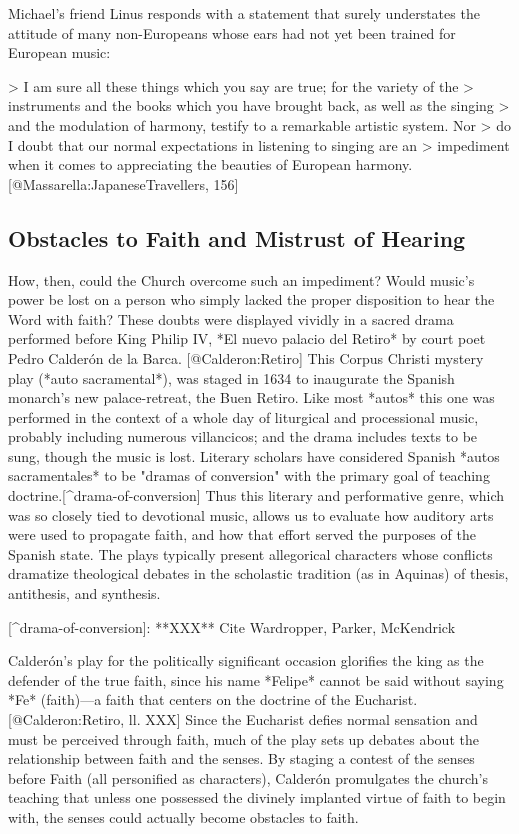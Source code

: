 Michael's friend Linus responds with a statement that surely understates the
attitude of many non-Europeans whose ears had not yet been trained for European
music:

> I am sure all these things which you say are true; for the variety of the
> instruments and the books which you have brought back, as well as the singing
> and the modulation of harmony, testify to a remarkable artistic system. Nor
> do I doubt that our normal expectations in listening to singing are an
> impediment when it comes to appreciating the beauties of European harmony.
[@Massarella:JapaneseTravellers, 156]


\subsection{Obstacles to Faith and Mistrust of Hearing}


How, then, could the Church overcome such an impediment? 
Would music's power be lost on a person who simply lacked the proper disposition
to hear the Word with faith? 
These doubts were displayed vividly in a sacred drama performed before King
Philip IV, *El nuevo palacio del Retiro* by court poet Pedro Calderón de la
Barca.
[@Calderon:Retiro]
This Corpus Christi mystery play (*auto sacramental*), was staged in 1634 to
inaugurate the Spanish monarch's new palace-retreat, the Buen Retiro.
Like most *autos* this one was performed in the context of a whole day of
liturgical and processional music, probably including numerous villancicos; and
the drama includes texts to be sung, though the music is lost.
Literary scholars have considered Spanish *autos sacramentales* to be "dramas of
conversion" with the primary goal of teaching doctrine.[^drama-of-conversion]
Thus this literary and performative genre, which was so closely tied to
devotional music, allows us to evaluate how auditory arts were used to propagate
faith, and how that effort served the purposes of the Spanish state.
The plays typically present allegorical characters whose conflicts dramatize
theological debates in the scholastic tradition (as in Aquinas) of thesis,
antithesis, and synthesis.

[^drama-of-conversion]:
**XXX** Cite Wardropper, Parker, McKendrick

Calderón's play for the politically significant occasion glorifies the king as
the defender of the true faith, since his name *Felipe* cannot be said without
saying *Fe* (faith)---a faith that centers on the doctrine of the Eucharist.
[@Calderon:Retiro, ll. XXX]
Since the Eucharist defies normal sensation and must be perceived through faith,
much of the play sets up debates about the relationship between faith and the
senses.
By staging a contest of the senses before Faith (all personified as characters),
Calderón promulgates the church's teaching that unless one possessed the
divinely implanted virtue of faith to begin with, the senses could actually
become obstacles to faith.

